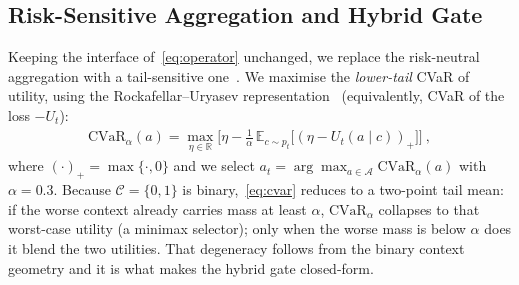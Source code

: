 \documentclass[journal]{IEEEtran}
\begin{document}
\subsection{Risk-Sensitive Aggregation and Hybrid Gate}
\label{sec:cvar}

Keeping the interface of~\eqref{eq:operator} unchanged, we replace the risk-neutral aggregation with a tail-sensitive one~\cite{rockafellar2000cvar,chow2015cvar}.
We maximise the \emph{lower-tail} CVaR of utility, using the Rockafellar--Uryasev representation~\cite{rockafellar2000cvar} (equivalently, CVaR of the loss \(-U_t\)):
\begin{align}
\label{eq:cvar}
\mathrm{CVaR}_\alpha(a)
=\max_{\eta\in\mathbb{R}}\Biggl[\eta-\frac{1}{\alpha}\,\mathbb{E}_{c\sim p_t}\bigl[(\eta-U_t(a\mid c))_+\bigr]\Biggr]\:,
\end{align}
where \((\cdot)_+=\max\{\cdot,0\}\) and we select \(a_t=\arg\max_{a\in\mathcal{A}}\mathrm{CVaR}_\alpha(a)\) with \(\alpha=0.3\).
Because \(\mathcal{C}=\{0,1\}\) is binary,~\eqref{eq:cvar} reduces to a two-point tail mean: if the worse context already carries mass at least \(\alpha\), \(\mathrm{CVaR}_\alpha\) collapses to that worst-case utility (a minimax selector); only when the worse mass is below \(\alpha\) does it blend the two utilities.
That degeneracy follows from the binary context geometry and it is what makes the hybrid gate closed-form.
\end{document}
